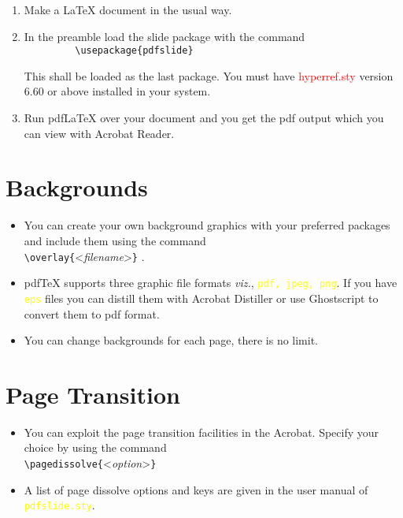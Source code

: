 \documentclass[a4paper]{article}
\begin{document}
\color{section2}
\begin{enumerate}

\item Make a \LaTeX{} document in the usual way.\pause

\item In the preamble load the slide package with the command\\
\color{red}\verb+         \usepackage{pdfslide}+\color{section2}

This shall be loaded as the last package.
You must have \textcolor{red}{hyperref.sty} version 6.60 or above
installed in your system.\pause

\item Run pdf\LaTeX{} over your document and you get the pdf output
which you can view with Acrobat Reader.
\end{enumerate}


\section{Backgrounds}
\color{white}
\begin{itemize}
\item You can create your own background graphics with your preferred
packages and include them using the command\\
\color{yellow}
\verb+\overlay{+\textless\emph{filename}\textgreater\verb+}+%
\color{white}.\pause

\item pdf\TeX{} supports three graphic file formats \emph{viz.},
\textcolor{yellow}{\tt pdf, jpeg, png}. If you have \textcolor{yellow}{\tt eps} files
you can distill them with Acrobat Distiller or use Ghostscript to
convert them to pdf format.\pause

\item You can change backgrounds for each page, there is no limit.

\end{itemize}

\section{Page Transition}
\color{white}
\begin{itemize}
\item You can exploit the page transition facilities in the Acrobat.
Specify your choice by using the command\\ \color{yellow}
\verb+\pagedissolve{+\textless\emph{option}\textgreater\verb+}+%
\color{white}\pause

\item A list of page dissolve options and keys are given in the user
manual of \textcolor{yellow}{\tt pdfslide.sty}.

\end{itemize}
\end{document}
